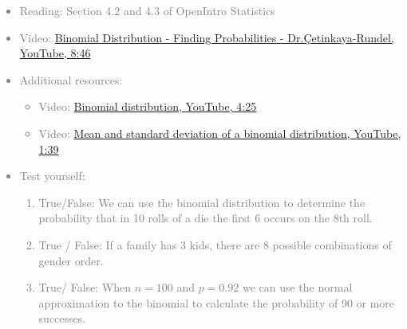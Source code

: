 \documentclass[11pt]{article}
\newcommand{\gray}[1]{\textcolor{gray}{#1}}
\begin{document}
%

\gray{
{\it
\vspace{-0.75cm}
\begin{itemize}
\renewcommand{\labelitemi}{{\textcolor{oiB}{$\ast$}}}
\item Reading: Section 4.2 and 4.3 of OpenIntro Statistics
\item Video: \href{http://www.youtube.com/watch?v=tKmyzhvgudw}{Binomial Distribution - Finding Probabilities - Dr.\c{C}etinkaya-Rundel, YouTube, 8:46}
\item Additional resources:
\begin{itemize}
\item Video: \href{http://www.youtube.com/watch?v=oYeJBdCGwxk&list=PL568547ACA9211CCA&index=28&feature=plpp_video}{Binomial distribution, YouTube, 4:25}
\item Video: \href{http://www.youtube.com/watch?v=0er3EiM-bpg&list=PL568547ACA9211CCA&index=27&feature=plpp_video}{Mean and standard deviation of a binomial distribution, YouTube, 1:39} 
\end{itemize}
\item Test yourself: 
\begin{enumerate}
\item True/False: We can use the binomial distribution to determine the probability that in 10 rolls of a die the first 6 occurs on the 8th roll.
\item True / False: If a family has 3 kids, there are 8 possible combinations of gender order.
\item True/ False: When $n = 100$ and $p = 0.92$ we can use the normal approximation to the binomial to calculate the probability of 90 or more successes.
\end{enumerate}
\end{itemize}
}}
\end{document}
